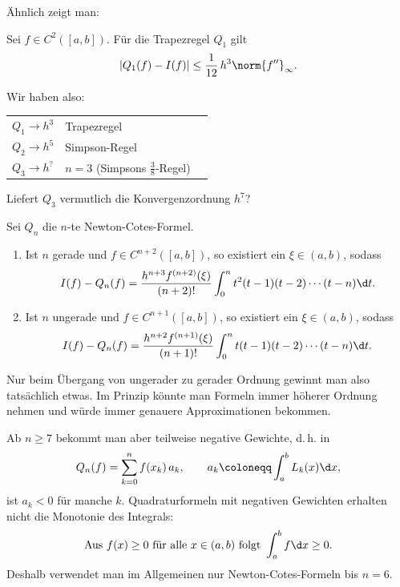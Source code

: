 \documentclass[11pt]{article}
\begin{document}
Ähnlich zeigt man:

\begin{lemma}\Theorem
  Sei $f \in C^2([a, b])$. Für die Trapezregel $Q_1$ gilt
  \[ \lvert Q_1(f) - I(f) \rvert \le \frac{1}{12}\, h^3 \norm{f''}_\infty. \]
\end{lemma}


Wir haben also:
\begin{center}
  \begin{tabular}{lll}
    $Q_1 \to h^3$ & Trapezregel \\
    $Q_2 \to h^5$ & Simpson-Regel \\
    $Q_3 \to h^{?}$ & $n = 3$ (Simpsons $\frac{3}{8}$-Regel)
  \end{tabular}
\end{center}
Liefert $Q_3$ vermutlich die Konvergenzordnung $h^7$?


\begin{theorem}\Theorem
  Sei $Q_n$ die $n$-te Newton-Cotes-Formel.
  \begin{enumerate}[label=(\alph*)]
    \item Ist $n$ gerade und $f \in C^{n+2}([a, b])$, so existiert ein $\xi \in (a, b)$, sodass
      \[ I(f) - Q_n(f) = \frac{h^{n+3} f^{(n+2)}(\xi)}{(n+2)!} \int_0^n t^2 (t - 1)(t - 2) \dotsm (t - n) \d t. \]
    \item Ist $n$ ungerade und $f \in C^{n+1}([a, b])$, so existiert ein $\xi \in (a, b)$, sodass
      \[ I(f) - Q_n(f) = \frac{h^{n+2} f^{(n+1)}(\xi)}{(n+1)!} \int_0^n t (t - 1)(t - 2) \dotsm (t - n) \d t. \]
  \end{enumerate}
\end{theorem}

\begin{note}
  Nur beim Übergang von ungerader zu gerader Ordnung gewinnt man also tatsächlich etwas. Im Prinzip könnte man Formeln immer höherer Ordnung nehmen und würde immer genauere Approximationen bekommen.

  Ab $n \ge 7$ bekommt man aber teilweise negative Gewichte, d.\,h. in
  \[ Q_n(f) = \sum_{k=0}^{n} f(x_k)\, a_k, \qquad a_k \coloneqq \int_a^b L_k(x) \d x, \]
  ist $a_k < 0$ für manche $k$. Quadraturformeln mit negativen Gewichten erhalten nicht die Monotonie des Integrals:
  \[ \text{Aus } f(x) \ge 0 \text{ für alle } x \in (a, b) \text{ folgt } \int_a^b f \d x \ge 0. \]
  Deshalb verwendet man im Allgemeinen nur Newton-Cotes-Formeln bis $n = 6$.
\end{note}
\end{document}
